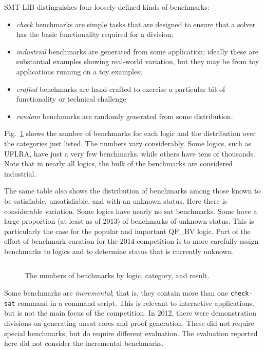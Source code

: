\documentclass{eptcs}
\begin{document}
SMT-LIB distinguishes four loosely-defined kinds of benchmarks:
\begin{itemize}[noitemsep,nolistsep]
\item {\em check} benchmarks are simple tasks that are designed to ensure that a solver has the basic functionality required for a division;
\item {\em industrial} benchmarks are generated from some application; ideally these are substantial examples showing real-world variation, but they may be from toy applications running on a toy examples;
\item {\em crafted} benchmarks are hand-crafted to exercise a particular bit of functionality or technical challenge
\item {\em random} benchmarks are randomly generated from some distribution.
\end{itemize}
Fig.~\ref{Fig:category} shows the number of benchmarks for each logic and the distribution over the categories just listed. The numbers vary considerably. Some logics, such as UFLRA, have just a very few benchmarks, while others have tens of thousands. Note that in nearly all logics, the bulk of the benchmarks are 
considered industrial.

The same table also shows the distribution of benchmarks among those known to be satisfiable, unsatisfiable, and with an unknown status. Here there is 
considerable variation. Some logics have nearly no sat benchmarks. Some have a large proportion (at least as of 2013) of benchmarks of unknown status.
This is particularly the case for the popular and important QF\_BV logic.
Part of the effort of benchmark curation for the 2014 competition is to more carefully assign benchmarks to logics and to determine status that is currently unknown.

\begin{figure}
\centering
\begin{tabular}{|l|r|rrrr|rrr|}
\hline

\end{tabular}
\caption{The numbers of benchmarks by logic, category, and result.}
\label{Fig:category}
\end{figure}

Some benchmarks are {\em incremental}; that is, they contain more than one {\tt check-sat} command in a command script. This is relevant to interactive applications, but is not the main focus of the competition. In 2012, there were demonstration divisions on generating unsat cores and proof generation. These did not require special benchmarks, but do require different evaluation. The evaluation reported here did not consider the incremental benchmarks.
\end{document}
